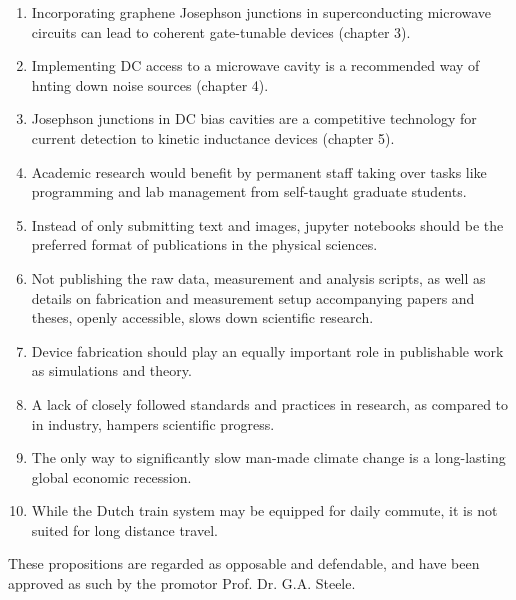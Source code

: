 \documentclass{dissertation-edit}
\begin{document}
\begin{enumerate}

\item Incorporating graphene Josephson junctions in superconducting microwave circuits can lead to coherent gate-tunable devices (chapter 3).
%
\item Implementing DC access to a microwave cavity is a recommended way of hnting down noise sources (chapter 4).
%
\item Josephson junctions in DC bias cavities are a competitive technology for current detection to kinetic inductance devices (chapter 5).
%
\item Academic research would benefit by permanent staff taking over tasks like programming and lab management from self-taught graduate students.
%
\item Instead of only submitting text and images, jupyter notebooks should be the preferred format of publications in the physical sciences.
%
\item Not publishing the raw data, measurement and analysis scripts, as well as details on fabrication and measurement setup accompanying papers and theses, openly accessible, slows down scientific research.
%
\item Device fabrication should play an equally important role in publishable work as simulations and theory.
%
\item A lack of closely followed standards and practices in research, as compared to in industry, hampers scientific progress.
%
\item The only way to significantly slow man-made climate change is a long-lasting global economic recession.
%
\item While the Dutch train system may be equipped for daily commute, it is not suited for long distance travel.

\end{enumerate}

\bigskip
\bigskip

\begin{center}
These propositions are regarded as opposable and defendable, and have been approved as such by the promotor Prof. Dr. G.A. Steele.
\end{center}
\end{document}
